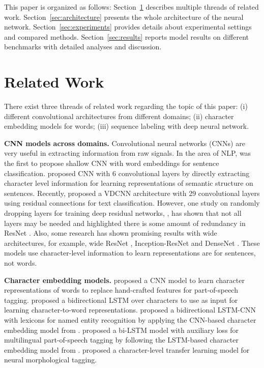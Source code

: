 \documentclass[11pt,a4paper]{article}
\begin{document}
This paper is organized as follows: Section~\ref{sec:related} describes multiple threads of related work. Section~\ref{sec:architecture} presents the whole architecture of the neural network. Section~\ref{sec:experiments} provides details about experimental settings and compared methods. Section~\ref{sec:results} reports model results on different benchmarks with detailed analyses and discussion.
 
\section{Related Work}
\label{sec:related}

There exist three threads of related work regarding the topic of this paper: (i) different convolutional architectures from different domains; (ii) character embedding models for words; (iii) sequence labeling with deep neural network.

\textbf{CNN models across domains.} Convolutional neural networks (CNNs) are very useful in extracting information from raw signals. In the area of NLP, \citet{kim2014convolutional} was the first to propose shallow CNN with word embeddings for sentence classification. \citet{zhang2015character} proposed CNN with 6 convolutional layers by directly extracting character level information for learning representations of semantic structure on sentences. Recently, \citet{conneau2017very} proposed a VDCNN architecture with 29 convolutional layers using residual connections for text classification. However, one study on randomly dropping layers for training deep residual networks, \cite{huang2016deep}, has shown that not all layers may be needed and highlighted there is some amount of redundancy in ResNet \cite{he2016deep}. Also, some research has shown promising results with wide architectures, for example, wide ResNet \cite{Zagoruyko2016wide}, Inception-ResNet \cite{szegedy2017inception} and DenseNet \cite{huang2017densely}. These models use character-level information to learn representations are for sentences, not words.

\textbf{Character embedding models.} \citet{santos2014learning} proposed a CNN model to learn character representations of words to replace hand-crafted features for part-of-speech tagging. \citet{ling2015finding} proposed a bidirectional LSTM over characters to use as input for learning character-to-word representations. \citet{chiu2015named} proposed a bidirectional LSTM-CNN with lexicons for named entity recognition by applying the CNN-based character embedding model from \citet{santos2014learning}. \citet{plank2016multilingual} proposed a bi-LSTM model with auxiliary loss for multilingual part-of-speech tagging by following the LSTM-based character embedding model from \citet{ling2015finding}. \citet{cotterell2017crosslingual} proposed a character-level transfer learning model for neural morphological tagging.
\end{document}
